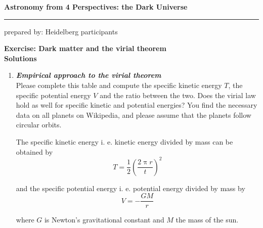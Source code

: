 \documentclass[a4paper,12pt]{article}
\newcommand{\question}[1]{\textbf{\textit{#1}}}
\newcommand{\HRule}{\rule{\linewidth}{0.3mm}}
\renewcommand{\pi}{\uppi}
\begin{document}
	\pagestyle{empty}
	
	\begin{center}
		\LARGE \textbf{Astronomy from 4 Perspectives: the Dark Universe}
		\HRule
	\end{center}
	\begin{flushright}
		prepared by: Heidelberg participants
	\end{flushright}
	\begin{center}
		{\Large \textbf{Exercise: Dark matter and the virial theorem}}\\
		\vspace*{2mm}
		{\Large \textbf{Solutions}}
		
	\end{center}
	\vspace{5mm}
	
	\begin{enumerate}
		
		\item \question{Empirical approach to the virial theorem}\\
		Please complete this table and compute the specific kinetic energy $T$, the specific potential energy $V$ and the ratio between the two. Does the virial law hold as well for specific kinetic and potential energies? You find the necessary data on all planets on Wikipedia, and please assume that the planets follow circular orbits.
		
		The specific kinetic energy i. e. kinetic energy divided by mass can be obtained by
		\begin{equation}
		T = \frac{1}{2}\left(\frac{2\pi r}{t}\right)^{2}
		\end{equation}
		
		and the specific potential energy i. e. potential energy divided by mass by
		\begin{equation}
		V = -\frac{GM}{r}
		\end{equation}
		
		where $G$ is Newton's gravitational constant and $M$ the mass of the sun.
		

\end{enumerate}
\end{document}
